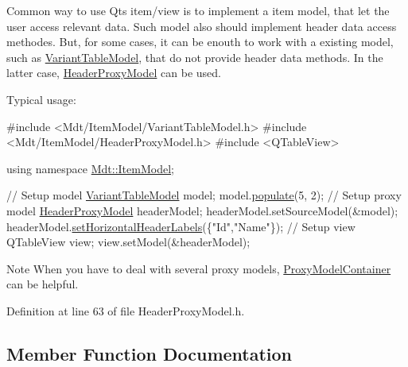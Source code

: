Common way to use Qt\textquotesingle{}s item/view is to implement a item model, that let the user access relevant data. Such model also should implement header data access methodes. But, for some cases, it can be enouth to work with a existing model, such as \hyperlink{class_mdt_1_1_item_model_1_1_variant_table_model}{Variant\+Table\+Model}, that do not provide header data methods. In the latter case, \hyperlink{class_mdt_1_1_item_model_1_1_header_proxy_model}{Header\+Proxy\+Model} can be used.

Typical usage\+: 
\begin{DoxyCode}
\textcolor{preprocessor}{#include <Mdt/ItemModel/VariantTableModel.h>}
\textcolor{preprocessor}{#include <Mdt/ItemModel/HeaderProxyModel.h>}
\textcolor{preprocessor}{#include <QTableView>}

\textcolor{keyword}{using namespace }\hyperlink{namespace_mdt_1_1_item_model}{Mdt::ItemModel};

\textcolor{comment}{// Setup model}
\hyperlink{class_mdt_1_1_item_model_1_1_variant_table_model}{VariantTableModel} model;
model.\hyperlink{class_mdt_1_1_item_model_1_1_variant_table_model_af9db809e602bc61d218245c605e3473b}{populate}(5, 2);
\textcolor{comment}{// Setup proxy model}
\hyperlink{class_mdt_1_1_item_model_1_1_header_proxy_model}{HeaderProxyModel} headerModel;
headerModel.setSourceModel(&model);
headerModel.\hyperlink{class_mdt_1_1_item_model_1_1_header_proxy_model_a88a4b7d8a409e1c9f970482389942c1b}{setHorizontalHeaderLabels}(\{\textcolor{stringliteral}{"Id"},\textcolor{stringliteral}{"Name"}\});
\textcolor{comment}{// Setup view}
QTableView view;
view.setModel(&headerModel);
\end{DoxyCode}


\begin{DoxyNote}{Note}
When you have to deal with several proxy models, \hyperlink{class_mdt_1_1_item_model_1_1_proxy_model_container}{Proxy\+Model\+Container} can be helpful. 
\end{DoxyNote}


Definition at line 63 of file Header\+Proxy\+Model.\+h.



\subsection{Member Function Documentation}
